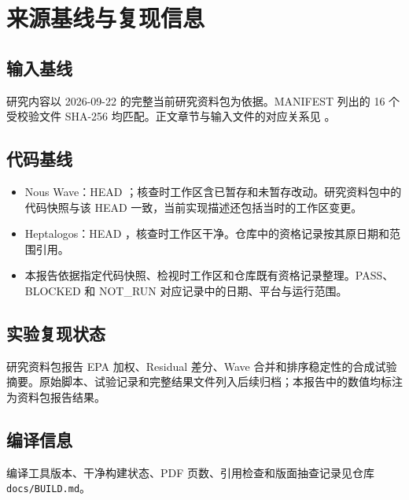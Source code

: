 \chapter{来源基线与复现信息}

\section{输入基线}

研究内容以 2026-09-22 的完整当前研究资料包为依据。MANIFEST 列出的 16 个受校验文件 SHA-256 均匹配。正文章节与输入文件的对应关系见 。

\section{代码基线}

\begin{itemize}
\item Nous Wave：HEAD \texttt{}；核查时工作区含已暂存和未暂存改动。研究资料包中的代码快照与该 HEAD 一致，当前实现描述还包括当时的工作区变更。
\item Heptalogos：HEAD \texttt{}，核查时工作区干净。仓库中的资格记录按其原日期和范围引用。
\item 本报告依据指定代码快照、检视时工作区和仓库既有资格记录整理。PASS、BLOCKED 和 NOT\_RUN 对应记录中的日期、平台与运行范围。
\end{itemize}

\section{实验复现状态}

研究资料包报告 EPA 加权、Residual 差分、Wave 合并和排序稳定性的合成试验摘要。原始脚本、试验记录和完整结果文件列入后续归档；本报告中的数值均标注为资料包报告结果。

\section{编译信息}

编译工具版本、干净构建状态、PDF 页数、引用检查和版面抽查记录见仓库 \texttt{docs/BUILD.md}。
